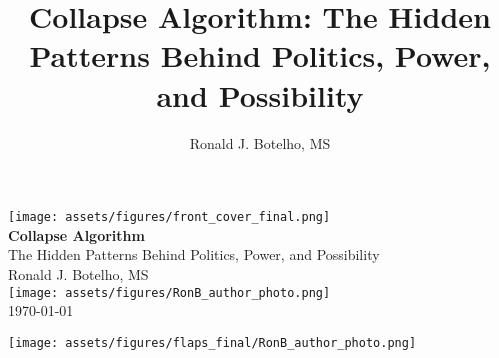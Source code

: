 \documentclass[12pt,twoside]{book}
\title{Collapse Algorithm: The Hidden Patterns Behind Politics, Power, and Possibility}
\author{Ronald J. Botelho, MS}
\date{}
\begin{document}
\begin{titlepage}
  \centering
  \texttt{[image: assets/figures/front\_cover\_final.png]} \\
  \vspace{1cm}
  {\Huge\bfseries Collapse Algorithm} \\[0.5cm]
  {\Large The Hidden Patterns Behind Politics, Power, and Possibility} \\[1.5cm]
  {\Large Ronald J. Botelho, MS} \\[2cm]
  \texttt{[image: assets/figures/RonB\_author\_photo.png]} \\[1cm]
  \vfill
  \today
\end{titlepage}
\clearpage

\clearpage

\frontmatter
\tableofcontents
\newpage




\mainmatter


















\backmatter





\cleardoublepage
\thispagestyle{empty}
\vspace*{\fill}

\begin{minipage}[t]{0.60\textwidth}
  
\end{minipage}
\hfill
\begin{minipage}[t]{0.35\textwidth}
  \centering
  \texttt{[image: assets/figures/flaps\_final/RonB\_author\_photo.png]}
\end{minipage}

\vspace{1.5cm}

\begin{center}
  \itshape
  
\end{center}

\vspace*{\fill}
\newpage
\end{document}
